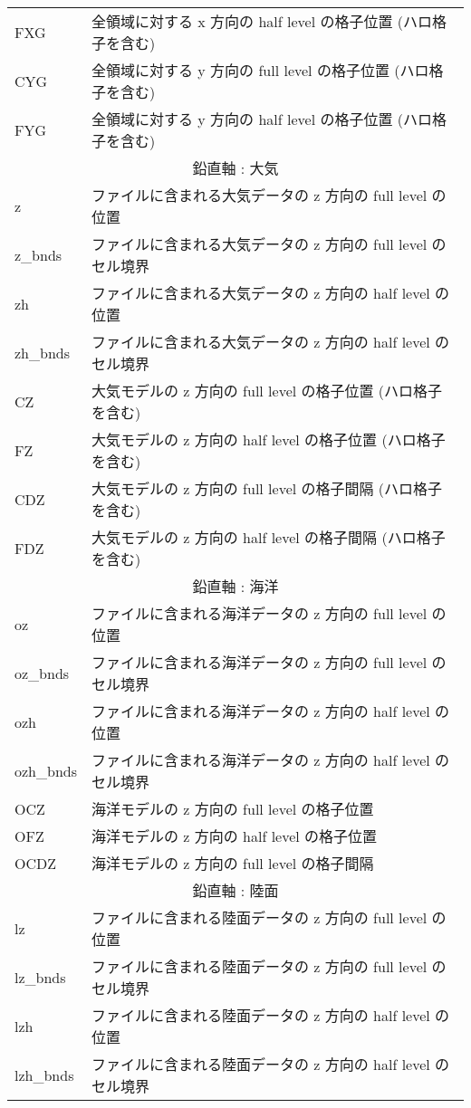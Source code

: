\begin{longtable}{l|l}
FXG & 全領域に対する x 方向の half level の格子位置 (ハロ格子を含む) \\
CYG & 全領域に対する y 方向の full level の格子位置 (ハロ格子を含む) \\
FYG & 全領域に対する y 方向の half level の格子位置 (ハロ格子を含む) \\ \hline
\multicolumn{2}{c}{鉛直軸 : 大気}\\ \hline
z         & ファイルに含まれる大気データの z 方向の full level の位置 \\
z\_bnds   & ファイルに含まれる大気データの z 方向の full level のセル境界 \\
zh        & ファイルに含まれる大気データの z 方向の half level の位置 \\
zh\_bnds  & ファイルに含まれる大気データの z 方向の half level のセル境界 \\
CZ  & 大気モデルの z 方向の full level の格子位置 (ハロ格子を含む) \\
FZ  & 大気モデルの z 方向の half level の格子位置 (ハロ格子を含む) \\
CDZ & 大気モデルの z 方向の full level の格子間隔 (ハロ格子を含む) \\
FDZ & 大気モデルの z 方向の half level の格子間隔 (ハロ格子を含む) \\ \hline
\multicolumn{2}{c}{鉛直軸 : 海洋}\\ \hline
oz        & ファイルに含まれる海洋データの z 方向の full level の位置 \\
oz\_bnds  & ファイルに含まれる海洋データの z 方向の full level のセル境界 \\
ozh       & ファイルに含まれる海洋データの z 方向の half level の位置 \\
ozh\_bnds & ファイルに含まれる海洋データの z 方向の half level のセル境界 \\
OCZ  & 海洋モデルの z 方向の full level の格子位置 \\
OFZ  & 海洋モデルの z 方向の half level の格子位置 \\
OCDZ & 海洋モデルの z 方向の full level の格子間隔 \\  \hline
\multicolumn{2}{c}{鉛直軸 : 陸面}\\ \hline
lz        & ファイルに含まれる陸面データの z 方向の full level の位置 \\
lz\_bnds  & ファイルに含まれる陸面データの z 方向の full level のセル境界 \\
lzh       & ファイルに含まれる陸面データの z 方向の half level の位置 \\
lzh\_bnds & ファイルに含まれる陸面データの z 方向の half level のセル境界 \\

\end{longtable}
